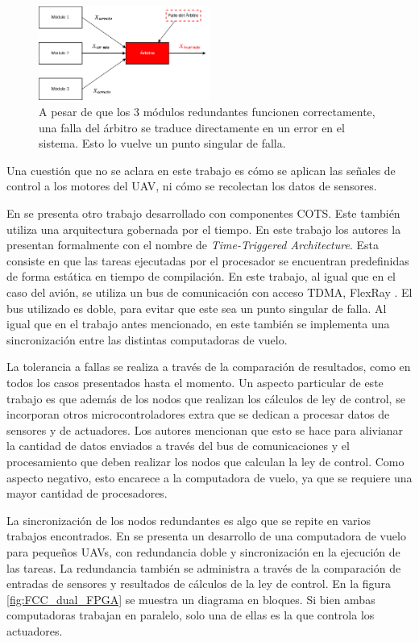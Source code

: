 \begin{figure}[H]
    \centering
    \includegraphics[width=0.5\textwidth]{img/falla_arbitro.png}
    \caption{A pesar de que los 3 módulos redundantes funcionen correctamente, una falla del árbitro se traduce directamente en un error en el sistema. Esto lo vuelve un punto singular de falla.}
    \label{fig:falla_arbitro}
\end{figure}

Una cuestión que no se aclara en este trabajo es cómo se aplican las señales de control a los motores del UAV, ni cómo se recolectan los datos de sensores.

En \cite{zhang2020architecture} se presenta otro trabajo desarrollado con componentes COTS. Este también utiliza una arquitectura gobernada por el tiempo. En este trabajo los autores la presentan formalmente con el nombre de \textit{Time-Triggered Architecture}. Esta consiste en que las tareas ejecutadas por el procesador se encuentran predefinidas de forma estática en tiempo de compilación. En este trabajo, al igual que en el caso del avión, se utiliza un bus de comunicación con acceso TDMA, FlexRay \cite{nxpAN12233}. El bus utilizado es doble, para evitar que este sea un punto singular de falla. Al igual que en el trabajo antes mencionado, en este también se implementa una sincronización entre las distintas computadoras de vuelo.

La tolerancia a fallas se realiza a través de la comparación de resultados, como en todos los casos presentados hasta el momento. Un aspecto particular de este trabajo es que además de los nodos que realizan los cálculos de ley de control, se incorporan otros microcontroladores extra que se dedican a procesar datos de sensores y de actuadores. Los autores mencionan que esto se hace para alivianar la cantidad de datos enviados a través del bus de comunicaciones y el procesamiento que deben realizar los nodos que calculan la ley de control. Como aspecto negativo, esto encarece a la computadora de vuelo, ya que se requiere una mayor cantidad de procesadores.

La sincronización de los nodos redundantes es algo que se repite en varios trabajos encontrados. En \cite{zhang2015dual} se presenta un desarrollo de una computadora de vuelo para pequeños UAVs, con redundancia doble y sincronización en la ejecución de las tareas. La redundancia también se administra a través de la comparación de entradas de sensores y resultados de cálculos de la ley de control. En la figura  \ref{fig:FCC_dual_FPGA} se muestra un diagrama en bloques. Si bien ambas computadoras trabajan en paralelo, solo una de ellas es la que controla los actuadores. 

